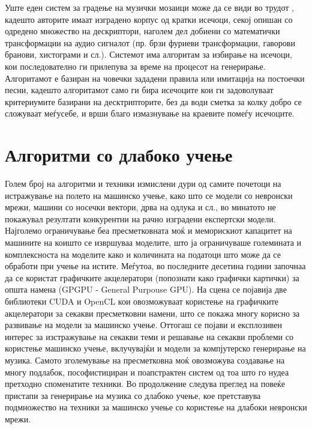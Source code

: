 Уште еден систем за градење на музички мозаици може да се види во трудот \cite{Schwarz2006}, кадешто авторите имаат изградено корпус од кратки исечоци, секој опишан со одредено множество на дескриптори, наголем дел добиени со математички трансформации на аудио сигналот (пр. брзи фуриеви трансформации, гаворови бранови, хистограми и сл.). Системот има алгоритам за избирање на исечоци, кои последователно ги прилепува за време на процесот на генерирање. Алгоритамот е базиран на човечки зададени правила или имитација на постоечки песни, кадешто алгоритамот само ги бира исечоците кои ги задоволуваат критериумите базирани на десктрипторите, без да води сметка за колку добро се сложуваат меѓусебе, и врши благо измазнување на краевите помеѓу исечоците.

\section{Алгоритми со длабоко учење} 

Голем број на алгоритми и техники измислени дури од самите почетоци на истражување на полето на машинско учење, како што се модели со невронски мрежи, машини со носечки вектори, дрва на одлука и сл., во минатото не покажувал резултати конкурентни на рачно изградени експертски модели. Најголемо ограничување беа пресметковната моќ и меморискиот капацитет на машините на коишто се извршуваа моделите, што ја ограничуваше големината и комплексноста на моделите како и количината на податоци што може да се обработи при учење на истите. Меѓутоа, во последните десетина години започнаа да се користат графичките акцелератори (попознати како графички картички) за општа намена (GPGPU - General Purpouse GPU). На сцена се појавија две библиотеки CUDA и OpenCL кои овозможуваат користење на графичките акцелератори за секакви пресметковни намени, што се покажа многу корисно за развивање на модели за машинско учење. Оттогаш се појави и експлозивен интерес за изстражување на секакви теми и решавање на секакви проблеми со користење машинско учење, вклучувајќи и модели за компјутерско генерирање на музика. Самото зголемување на пресметковна моќ овозможува создавање на многу подлабок, пософистициран и поапстрактен систем од тоа што го нудеа претходно споменатите техники. Во продолжение следува преглед на повеќе пристапи за генерирање на музика со длабоко учење, кое претставува подмножество на техники за машинско учење со користење на длабоки невронски мрежи.


